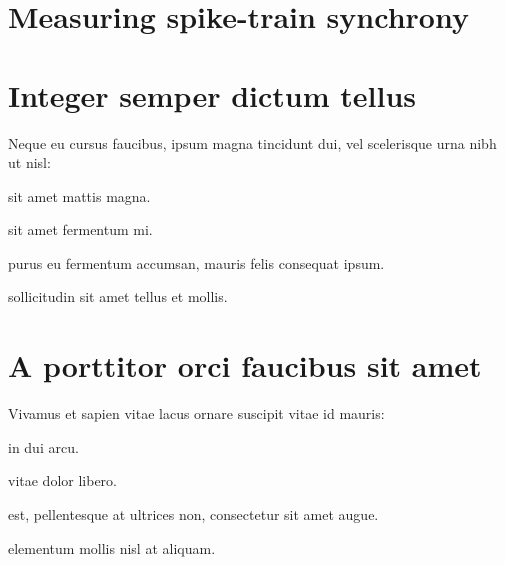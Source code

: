 \section{Measuring spike-train synchrony}
\section*{Integer semper dictum tellus}

Neque eu cursus faucibus, ipsum magna tincidunt dui, vel scelerisque urna nibh ut nisl:

\begin{description}[labelwidth=\widthof{\bfseries morbi convallis},align=left]
\item[Duis]{sit amet mattis magna.}
\item[Curabitur]{sit amet fermentum mi.}
\item[Morbi convallis]{purus eu fermentum accumsan, mauris felis consequat ipsum.}
\item[Ut]{sollicitudin sit amet tellus et mollis.}
\end{description}

\section*{A porttitor orci faucibus sit amet}

Vivamus et sapien vitae lacus ornare suscipit vitae id mauris:

\begin{description}[labelwidth=\widthof{\bfseries suspendisse},align=left]
\item[Vivamus]{in dui arcu.}
\item[Morbi]{vitae dolor libero.}
\item[Tellus]{est, pellentesque at ultrices non, consectetur sit amet augue.}
\item[Suspendisse]{elementum mollis nisl at aliquam.}
\end{description}
